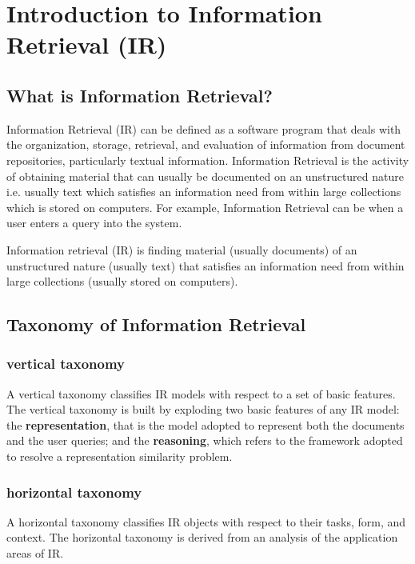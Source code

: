 \chapter{Introduction to Information Retrieval (IR)}

\section{What is Information Retrieval?}
Information Retrieval (IR) can be defined as a software program that deals with the organization, storage, retrieval, and evaluation of information from document repositories, particularly textual information. Information Retrieval is the activity of obtaining material that can usually be documented on an unstructured nature i.e. usually text which satisfies an information need from within large collections which is stored on computers. For example, Information Retrieval can be when a user enters a query into the system. \cite{gfg-what-is-ir}



Information retrieval (IR) is finding material (usually documents) of an unstructured nature (usually text) that satisfies an information need from within large collections (usually stored on computers). \cite{ir-1}


\section{Taxonomy of Information Retrieval \cite{researchgate/47397195_A_Taxonomy_of_Information_Retrieval_Models_and_Tools}}

\subsection{vertical taxonomy}

A vertical taxonomy classifies IR models with respect to a set of basic features.
The vertical taxonomy is built by exploding two basic features of any IR model: the \textbf{representation}, that is the model adopted to represent both the documents and the user queries; and the \textbf{reasoning}, which refers to the framework adopted to resolve a representation similarity problem. 

\subsection{horizontal taxonomy}

A horizontal taxonomy classifies IR objects with respect to their tasks, form, and context. 
The horizontal taxonomy is derived from an analysis of the application areas of IR.


